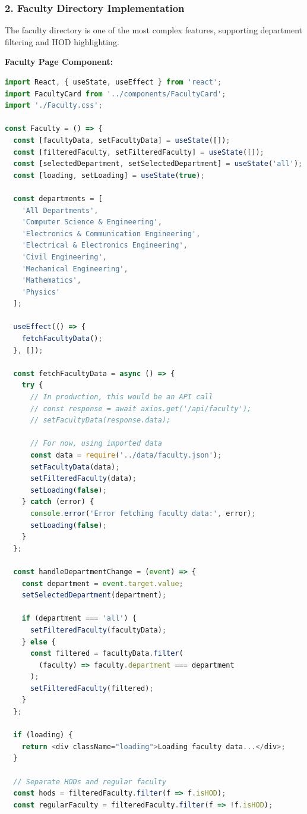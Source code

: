 \documentclass[12pt,a4paper]{report}
\begin{document}
\subsubsection*{2. Faculty Directory Implementation}

The faculty directory is one of the most complex features, supporting department filtering and HOD highlighting.

\textbf{Faculty Page Component:}
\begin{lstlisting}[language=JavaScript, caption=Faculty Directory with Filtering]
import React, { useState, useEffect } from 'react';
import FacultyCard from '../components/FacultyCard';
import './Faculty.css';

const Faculty = () => {
  const [facultyData, setFacultyData] = useState([]);
  const [filteredFaculty, setFilteredFaculty] = useState([]);
  const [selectedDepartment, setSelectedDepartment] = useState('all');
  const [loading, setLoading] = useState(true);

  const departments = [
    'All Departments',
    'Computer Science & Engineering',
    'Electronics & Communication Engineering',
    'Electrical & Electronics Engineering',
    'Civil Engineering',
    'Mechanical Engineering',
    'Mathematics',
    'Physics'
  ];

  useEffect(() => {
    fetchFacultyData();
  }, []);

  const fetchFacultyData = async () => {
    try {
      // In production, this would be an API call
      // const response = await axios.get('/api/faculty');
      // setFacultyData(response.data);
      
      // For now, using imported data
      const data = require('../data/faculty.json');
      setFacultyData(data);
      setFilteredFaculty(data);
      setLoading(false);
    } catch (error) {
      console.error('Error fetching faculty data:', error);
      setLoading(false);
    }
  };

  const handleDepartmentChange = (event) => {
    const department = event.target.value;
    setSelectedDepartment(department);

    if (department === 'all') {
      setFilteredFaculty(facultyData);
    } else {
      const filtered = facultyData.filter(
        (faculty) => faculty.department === department
      );
      setFilteredFaculty(filtered);
    }
  };

  if (loading) {
    return <div className="loading">Loading faculty data...</div>;
  }

  // Separate HODs and regular faculty
  const hods = filteredFaculty.filter(f => f.isHOD);
  const regularFaculty = filteredFaculty.filter(f => !f.isHOD);


\end{lstlisting}
\end{document}
